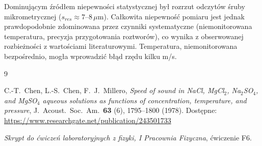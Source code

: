 \documentclass[12pt, a4paper]{article}
\begin{document}
Dominującym źródłem niepewności statystycznej był rozrzut odczytów śruby mikrometrycznej ($s_{res} \approx 7$--$8\,\mu\mathrm{m}$). Całkowita niepewność pomiaru jest jednak prawdopodobnie zdominowana przez czynniki systematyczne (niemonitorowana temperatura, precyzja przygotowania roztworów), co wynika z obserwowanej rozbieżności z wartościami literaturowymi. Temperatura, niemonitorowana bezpośrednio, mogła wprowadzić błąd rzędu kilku m/s.


\begin{thebibliography}{9}

C.\nobreakdash-T.\ Chen, L.\nobreakdash-S.\ Chen, F.\ J.\ Millero,
\textit{Speed of sound in NaCl, MgCl$_2$, Na$_2$SO$_4$, and MgSO$_4$ aqueous
solutions as functions of concentration, temperature, and pressure},
J.\ Acoust.\ Soc.\ Am.\ \textbf{63} (6), 1795--1800 (1978).
Dostępne: \url{https://www.researchgate.net/publication/243501733}

\textit{Skrypt do ćwiczeń laboratoryjnych z fizyki, I Pracownia Fizyczna}, ćwiczenie F6.
\end{thebibliography}
\end{document}
